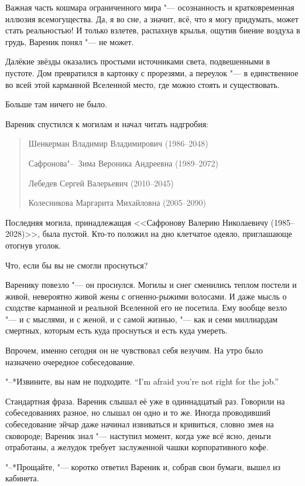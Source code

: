 Важная часть кошмара ограниченного мира "--- осознанность и кратковременная иллюзия всемогущества.
Да, я во сне, а значит, всё, что я могу придумать, может стать реальностью!
И только взлетев, распахнув крылья, ощутив биение воздуха в грудь, Вареник понял "--- не может.

Далёкие звёзды оказались простыми источниками света, подвешенными в пустоте.
Дом превратился в картонку с прорезями, а переулок "--- в единственное во всей этой карманной Вселенной место, где можно стоять и существовать.

Больше там ничего не было.

Вареник спустился к могилам и начал читать надгробия:

\begin{quote}
Шенкерман Владимир Владимирович (1986--2048)

Сафронова"--~Зима Вероника Андреевна (1989--2072)

Лебедев Сергей Валерьевич (2010--2045)

Колесникова Маргарита Михайловна (2005--2090)
\end{quote}

Последняя могила, принадлежащая <<Сафронову Валерию Николаевичу (1985--2028)>>, была пустой.
Кто-то положил на дно клетчатое одеяло, приглашающе отогнув уголок.

Что, если бы вы не смогли проснуться?

Варенику повезло "--- он проснулся.
Могилы и снег сменились теплом постели и живой, невероятно живой жены с огненно-рыжими волосами.
И даже мысль о сходстве карманной и реальной Вселенной его не посетила.
Ему вообще везло "--- и с мыслями, и с женой, и с самой жизнью, "--- как и семи миллиардам смертных, которым есть куда проснуться и есть куда умереть.

Впрочем, именно сегодня он не чувствовал себя везучим.
На утро было назначено очередное собеседование.

\asterism

{"--*Извините, вы нам не подходите.}
{``I'm afraid you're not right for the job.''}

Стандартная фраза.
Вареник слышал её уже в одиннадцатый раз.
Говорили на собеседованиях разное, но слышал он одно и то же.
Иногда проводивший собеседование эйчар даже начинал извиваться и кривиться, словно змея на сковороде;
Вареник знал "--- наступил момент, когда уже всё ясно, деньги отработаны, а желудок требует заслуженной чашки корпоративного кофе.

"--*Прощайте, "--- коротко ответил Вареник и, собрав свои бумаги, вышел из кабинета.

